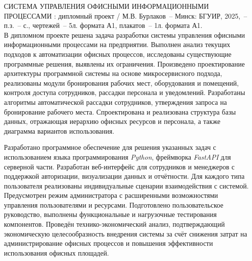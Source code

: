 \thispagestyle{empty}

СИСТЕМА УПРАВЛЕНИЯ ОФИСНЫМИ ИНФОРМАЦИОННЫМИ ПРОЦЕССАМИ : дипломный проект / М.В. Бурлаков~-- Минск: БГУИР, 2025,~-- п.з.~-- \pageref*{LastPage} с., чертежей~-- 5л. формата А1, плакатов~-- 1л. формата А1. \\


В дипломном проекте решена задача разработки системы управления офисными информационными процессами на предприятии. Выполнен анализ текущих подходов к автоматизации офисных процессов, исследованы существующие программные решения, выявлены их ограничения. Произведено проектирование архитектуры программной системы на основе микросервисного подхода, реализованы модули бронирования рабочих мест, оборудования и помещений, контроля доступа сотрудников, рассадки персонала и уведомлений. Разработаны алгоритмы автоматической рассадки сотрудников, утверждения запроса на бронирование рабочего места. Спроектирована и реализована структура базы данных, отражающая иерархию офисных ресурсов и персонала, а также диаграмма вариантов использования.

Разработано программное обеспечение для решения указанных задач с использованием языка программирования \textit{Python}, фреймворка \textit{FastAPI} для серверной части. Разработан веб-интерфейс для сотрудников и менеджеров с поддержкой авторизации, визуализации данных и отчётности. Для каждого типа пользователя реализованы индивидуальные сценарии взаимодействия с системой. Предусмотрен режим администратора с расширенными возможностями управления пользователями и ресурсами. Подготовлено пользовательское руководство, выполнены функциональные и нагрузочные тестирования компонентов. Проведён технико-экономический анализ, подтверждающий экономическую целесообразность внедрения системы за счёт снижения затрат на администрирование офисных процессов и повышения эффективности использования офисных площадей.
